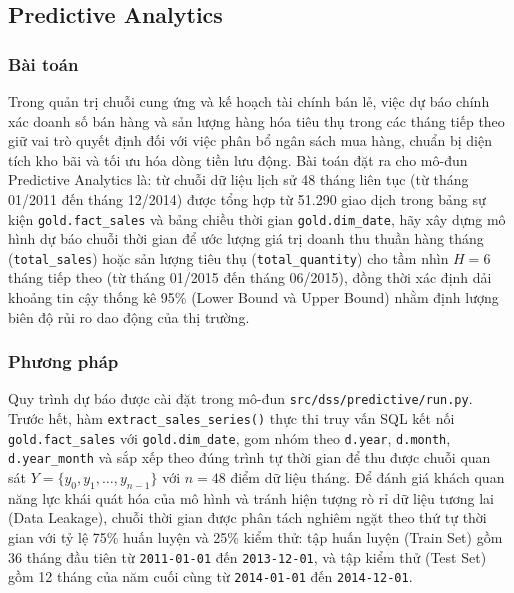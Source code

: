 \subsection{Predictive Analytics}

\subsubsection{Bài toán}

Trong quản trị chuỗi cung ứng và kế hoạch tài chính bán lẻ, việc dự báo chính xác doanh số bán hàng và sản lượng hàng hóa tiêu thụ trong các tháng tiếp theo giữ vai trò quyết định đối với việc phân bổ ngân sách mua hàng, chuẩn bị diện tích kho bãi và tối ưu hóa dòng tiền lưu động. Bài toán đặt ra cho mô-đun Predictive Analytics là: từ chuỗi dữ liệu lịch sử 48 tháng liên tục (từ tháng 01/2011 đến tháng 12/2014) được tổng hợp từ 51.290 giao dịch trong bảng sự kiện \texttt{gold.fact\_sales} và bảng chiều thời gian \texttt{gold.dim\_date}, hãy xây dựng mô hình dự báo chuỗi thời gian để ước lượng giá trị doanh thu thuần hàng tháng (\texttt{total\_sales}) hoặc sản lượng tiêu thụ (\texttt{total\_quantity}) cho tầm nhìn $H = 6$ tháng tiếp theo (từ tháng 01/2015 đến tháng 06/2015), đồng thời xác định dải khoảng tin cậy thống kê 95\% (Lower Bound và Upper Bound) nhằm định lượng biên độ rủi ro dao động của thị trường.

\subsubsection{Phương pháp}

Quy trình dự báo được cài đặt trong mô-đun \texttt{src/dss/predictive/run.py}. Trước hết, hàm \texttt{extract\_sales\_series()} thực thi truy vấn SQL kết nối \texttt{gold.fact\_sales} với \texttt{gold.dim\_date}, gom nhóm theo \texttt{d.year}, \texttt{d.month}, \texttt{d.year\_month} và sắp xếp theo đúng trình tự thời gian để thu được chuỗi quan sát $Y = \{y_0, y_1, \dots, y_{n-1}\}$ với $n = 48$ điểm dữ liệu tháng. Để đánh giá khách quan năng lực khái quát hóa của mô hình và tránh hiện tượng rò rỉ dữ liệu tương lai (Data Leakage), chuỗi thời gian được phân tách nghiêm ngặt theo thứ tự thời gian với tỷ lệ 75\% huấn luyện và 25\% kiểm thử: tập huấn luyện (Train Set) gồm 36 tháng đầu tiên từ \texttt{2011-01-01} đến \texttt{2013-12-01}, và tập kiểm thử (Test Set) gồm 12 tháng của năm cuối cùng từ \texttt{2014-01-01} đến \texttt{2014-12-01}.

